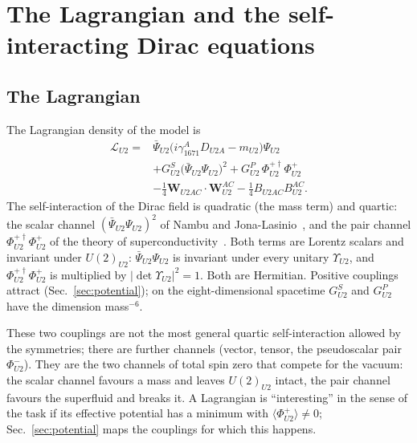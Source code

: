 \section{The Lagrangian and the self-interacting Dirac equations}
\label{sec:lagrangian}

\subsection{The Lagrangian}

The Lagrangian density of the model is
\begin{equation}
\begin{aligned}
\mathcal L_{U2}={}&\bar\Psi_{U2}\big(i\gamma^A_{1671}D_{U2A}-m_{U2}\big)\Psi_{U2}\\
&+G^S_{U2}\big(\bar\Psi_{U2}\Psi_{U2}\big)^2+G^P_{U2}\,\Phi^{+\dagger}_{U2}\Phi^+_{U2}\\
&-\tfrac14\boldsymbol W_{U2AC}\cdot\boldsymbol W^{AC}_{U2}-\tfrac14B_{U2AC}B^{AC}_{U2}.
\end{aligned}
\label{eq:L}
\end{equation}
The self-interaction of the Dirac field is quadratic (the mass term) and quartic: the scalar
channel $(\bar\Psi_{U2}\Psi_{U2})^2$ of Nambu and Jona-Lasinio~\cite{NJL1961}, and the pair channel
$\Phi^{+\dagger}_{U2}\Phi^+_{U2}$ of the theory of superconductivity~\cite{BCS1957}. Both terms are
Lorentz scalars and invariant under $U(2)_{U2}$: $\bar\Psi_{U2}\Psi_{U2}$ is invariant under every
unitary $\Upsilon_{U2}$, and $\Phi^{+\dagger}_{U2}\Phi^+_{U2}$ is multiplied by
$|\det\Upsilon_{U2}|^2=1$. Both are Hermitian. Positive couplings attract (Sec.~\ref{sec:potential});
on the eight-dimensional spacetime $G^S_{U2}$ and $G^P_{U2}$ have the dimension mass$^{-6}$.

These two couplings are not the most general quartic self-interaction allowed by the symmetries;
there are further channels (vector, tensor, the pseudoscalar pair $\Phi^-_{U2}$). They are the two
channels of total spin zero that compete for the vacuum: the scalar channel favours a mass and
leaves $U(2)_{U2}$ intact, the pair channel favours the superfluid and breaks it. A Lagrangian is
``interesting'' in the sense of the task if its effective potential has a minimum with
$\langle\Phi^+_{U2}\rangle\neq0$; Sec.~\ref{sec:potential} maps the couplings for which this
happens.

